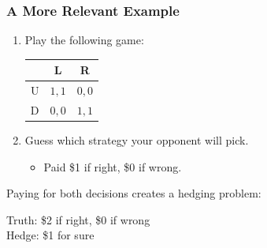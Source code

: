 \begin{frame}
  \frametitle{A More Relevant Example}

  \begin{enumerate}
    \item Play the following game:\\
    \begin{center}
      \begin{tabular}{|c|c|c|}
        \hline
                & L & R  \\
        \hline
            U   & $1,1$ & $0,0$ \\
        \hline
            D   & $0,0$ & $1,1$ \\
        \hline
      \end{tabular}
    \end{center}
    \item Guess which strategy your opponent will pick.
    \begin{itemize}
      \item Paid \$1 if right, \$0 if wrong.
    \end{itemize}
  \end{enumerate}

\bigskip

Paying for both decisions creates a hedging problem:

\smallskip

Truth: \$2 if right, \$0 if wrong\\
Hedge: \$1 for sure

\end{frame}


